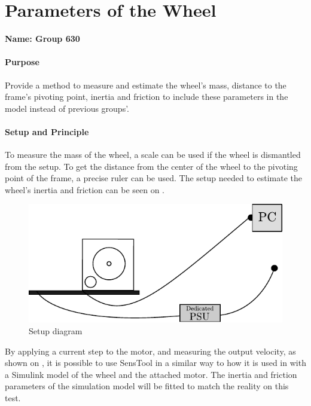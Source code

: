 \chapter{Parameters of the Wheel}\label{app:wheelParameters} 
\textbf{Name: Group 630}\\

\subsubsection{Purpose}
Provide a method to measure and estimate the wheel's mass, distance to the frame's pivoting point, inertia and friction to include these parameters in the model instead of previous groups'.

\subsubsection{Setup and Principle}

To measure the mass of the wheel, a scale can be used if the wheel is dismantled from the setup. To get the distance from the center of the wheel to the pivoting point of the frame, a precise ruler can be used.
The setup needed to estimate the wheel's inertia and friction can be seen on .
\begin{figure}[H]
  \centering
  \includegraphics[scale=1]{figures/wheelParameterTestSetup}
  \caption{Setup diagram}
  \label{fig:wheelParameterTestSetup}
\end{figure}

By applying a current step to the motor, and measuring the output velocity, as shown on , it is possible to use SensTool in a similar way to how it is used in  with a Simulink model of the wheel and the attached motor. The inertia and friction parameters of the simulation model will be fitted to match the reality on this test.

